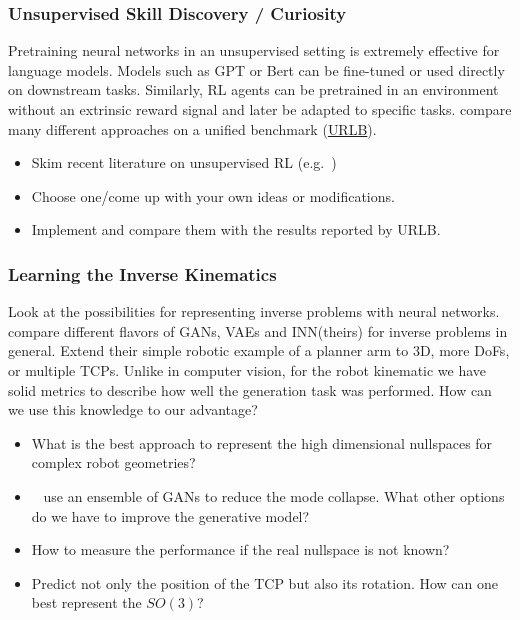 \documentclass[a4paper]{article}
\begin{document}
\subsubsection{Unsupervised Skill Discovery / Curiosity}
Pretraining neural networks in an unsupervised setting is extremely effective for language models. Models such as GPT or Bert can be fine-tuned or used directly on downstream tasks.
Similarly, RL agents can be pretrained in an environment without an extrinsic reward signal and later be adapted to specific tasks.
\citet{Laskin2021} compare many different approaches on a unified benchmark (\href{https://github.com/rll-research/url_benchmark}{URLB}).
\begin{itemize}
  \item Skim recent literature on unsupervised RL (e.g.~\cite{Hafner2023, Laskin2022, Li2023InternalReward})
  \item Choose one/come up with your own ideas or modifications.
  \item Implement and compare them with the results reported by URLB.
\end{itemize}

\subsubsection{Learning the Inverse Kinematics}
Look at the possibilities for representing inverse problems with neural networks.
~\citet{Ardizzone2018inverse} compare different flavors of GANs, VAEs and INN(theirs) for inverse problems in general.
Extend their simple robotic example of a planner arm to 3D, more DoFs, or multiple TCPs.
Unlike in computer vision, for the robot kinematic we have solid metrics to describe how well the generation task was performed.
How can we use this knowledge to our advantage?
\begin{itemize}
  \item What is the best approach to represent the high dimensional nullspaces for complex robot geometries?
  \item ~\citet{Lembono2021GAN} use an ensemble of GANs to reduce the mode collapse.
        What other options do we have to improve the generative model?
  \item How to measure the performance if the real nullspace is not known?
  \item Predict not only the position of the TCP but also its rotation.
        How can one best represent the $SO(3)$?
\end{itemize}
\end{document}

